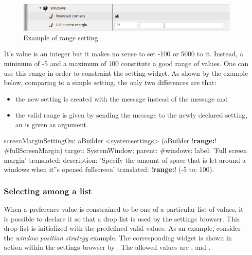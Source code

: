 \documentclass[a4paper,10pt,twoside]{book}
\begin{document}
\begin{figure}[tbh]
\begin{center}
\includegraphics[scale=0.38]{fullScreenMargin}
\caption{Example of range setting}
\end{center}
\end{figure}

It's value is an integer but it makes no sense to set -100 or 5000 to it. 
Instead, a minimum of -5 and a maximum of 100 constitute a good range of values. One can use this range in order to constraint the setting widget. As shown by the example below, comparing to a simple setting, the only two differences are that:
\begin{itemize}
\item 
	the new setting is created with the  message instead of the  message and
\item
	the valid range is given by sending the  message to the newly declared setting, an  is given as argument.
\end{itemize}

\begin{code}{}
screenMarginSettingOn: aBuilder
	<systemsettings>
	(aBuilder !\textbf{range:}! #fullScreenMargin)
		target: SystemWindow;
		parent: #windows;
		label: 'Full screen margin' translated;
		description: 'Specify the amount of space that is let around a windows when it''s opened fullscreen' translated;
		!\textbf{range:}! (-5 to: 100).
\end{code}

\subsubsection{Selecting among a list}
When a preference value is constrained to be one of a particular list of values, it is possible to declare it so that a drop list is used by the settings browser. This drop list is initialized with the predefined valid values. As an example, consider the \textit{window position strategy} example. The corresponding widget is shown in action within the settings browser by . The allowed values are ,  and .
\end{document}
